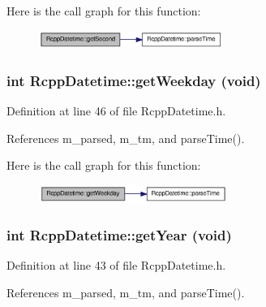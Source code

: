 Here is the call graph for this function:\nopagebreak
\begin{figure}[H]
\begin{center}
\leavevmode
\includegraphics[width=170pt]{classRcppDatetime_a2feb900005890d183cc5f6a626c4d614_cgraph}
\end{center}
\end{figure}
\hypertarget{classRcppDatetime_a796802561fa8bb87a8e2a1836afaaa58}{
\subsubsection[{getWeekday}]{\setlength{\rightskip}{0pt plus 5cm}int RcppDatetime::getWeekday (void)}}
\label{classRcppDatetime_a796802561fa8bb87a8e2a1836afaaa58}


Definition at line 46 of file RcppDatetime.h.

References m\_\-parsed, m\_\-tm, and parseTime().

Here is the call graph for this function:\nopagebreak
\begin{figure}[H]
\begin{center}
\leavevmode
\includegraphics[width=174pt]{classRcppDatetime_a796802561fa8bb87a8e2a1836afaaa58_cgraph}
\end{center}
\end{figure}
\hypertarget{classRcppDatetime_aba930a8d7d575eb10444258a442027cf}{
\subsubsection[{getYear}]{\setlength{\rightskip}{0pt plus 5cm}int RcppDatetime::getYear (void)}}
\label{classRcppDatetime_aba930a8d7d575eb10444258a442027cf}


Definition at line 43 of file RcppDatetime.h.

References m\_\-parsed, m\_\-tm, and parseTime().

